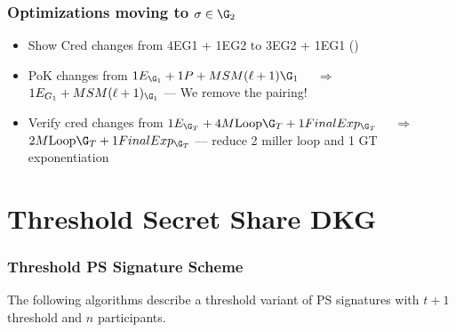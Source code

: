 \subsubsection{Optimizations moving to $\sigma \in \G_2$}
\begin{itemize}
    \item Show Cred changes from 4EG1 + 1EG2 to 3EG2 + 1EG1 ()
    \item PoK changes from $1E_{\G_1} + 1P + MSM(\ell + 1)\G_1$ $\quad \Rightarrow \quad$ $ 1E_{G_1} +MSM(\ell + 1)_{\G_1}$ --- We remove the pairing!
    \item Verify cred changes from $1E_{\G_T} + 4M\text{Loop}\G_T + 1FinalExp_{\G_T}$ $\quad \Rightarrow \quad$ $2M\text{Loop}\G_T + 1FinalExp_{\G_T}$ --- reduce 2 miller loop and 1 GT exponentiation
\end{itemize}

















\newpage
\section{Threshold Secret Share DKG}
\subsubsection{Threshold PS Signature Scheme}
\noindent The following algorithms describe a threshold variant of PS signatures with $t+1$ threshold and $n$ participants.

